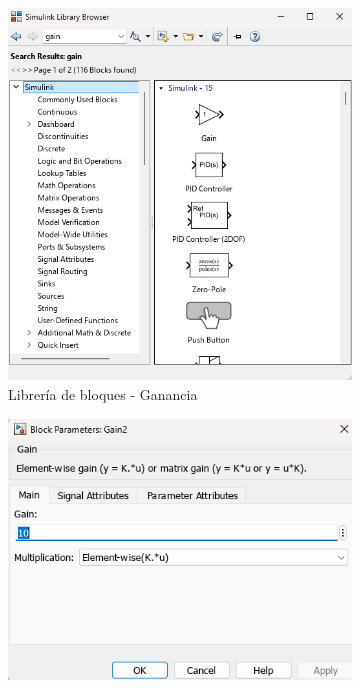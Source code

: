 \begin{figure}[htbp]
    \centering
    \begin{subfigure}[b]{0.35\textwidth}
        \centering
        \includegraphics[width=\textwidth]{fig/Capitulo5/Caso_de_estudio_PID/lib_gain.png}
        \caption{Librería de bloques - Ganancia}
        \label{fig:lib_bloques_gain}
    \end{subfigure}
    \hfill
    \begin{subfigure}[b]{0.45\textwidth}
        \centering
        \includegraphics[width=\textwidth]{fig/Capitulo5/Caso_de_estudio_PID/config_gain_10.png}

\end{subfigure}
\end{figure}
